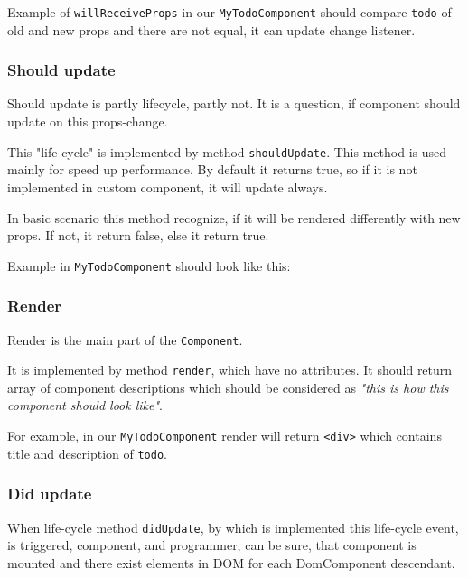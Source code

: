       Example of \texttt{willReceiveProps} in our \texttt{MyTodoComponent} 
      should compare \texttt{todo} of old and new props and there are not equal, 
      it can update change listener.
      
      
      
    \subsubsection{Should update}\label{subsec:our-architecture-lifecycle-shouldupdate}
      Should update is partly lifecycle, partly not. 
      It is a question, if component should update on  this props-change. 

      This "life-cycle" is implemented by method \texttt{shouldUpdate}. 
      This method is used mainly for speed up performance. 
      By default it returns true, 
      so if it is not implemented in custom component, 
      it will update always.

      In basic scenario this method recognize, 
      if it will be rendered differently with new props.  
      If not, it return false, else it return true.

      Example in \texttt{MyTodoComponent} should look like this:
      

    \subsubsection{Render}\label{subsec:our-architecture-lifecycle-render}

      Render is the main part of the \texttt{Component}. 

      It is implemented by method \texttt{render}, which have no attributes.
      It should return array of component descriptions which should be considered as 
      \textit{"this is how this component should look like"}.

      For example, in our \texttt{MyTodoComponent} render will return \texttt{<div>} which contains title and description of \texttt{todo}.
      

    \subsubsection{Did update}\label{subsec:our-architecture-lifecycle-didupdate}

      When life-cycle method \texttt{didUpdate}, 
      by which is implemented this life-cycle event, 
      is triggered, component, and programmer, can be sure, 
      that component is mounted and there exist elements in DOM for each DomComponent descendant.

